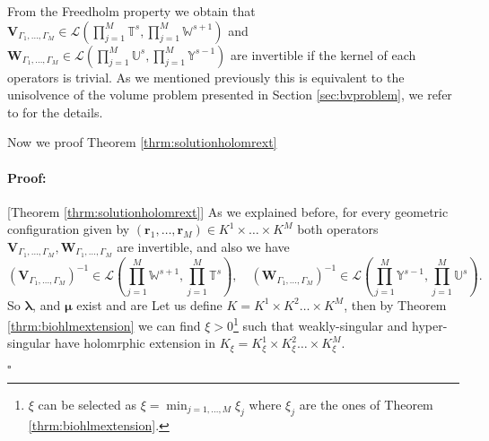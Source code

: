 \documentclass{article}
\newenvironment{proof}{\paragraph{Proof:}}{\hfill$\square$}
\newcommand{\bmu} {\bm{\mu}}
\newcommand{\IU}{{\mathbb U}}
\newcommand{\IT}{{\mathbb T}}
\newcommand{\IW}{{\mathbb W}}
\newcommand{\IY}{{\mathbb Y}}
\newcommand{\bla}{\boldsymbol \lambda}
\newcommand{\br}{\bm{r}}
\begin{document}
From the Freedholm property  we obtain that $\mathbf{V}_{\Gamma_1,\hdots,\Gamma_M} \in \mathcal{L} \left( \prod_{j=1}^M \IT^{s}, \prod_{j=1}^M \IW^{s+1} \right)$ and $\mathbf{W}_{\Gamma_1,\hdots,\Gamma_M} \in \mathcal{L} \left( \prod_{j=1}^M \IU^{s}, \prod_{j=1}^M \IY^{s-1} \right)$ are invertible if the kernel of each operators is trivial. As we mentioned previously this is equivalent to the unisolvence of the volume problem presented in Section \ref{sec:bvproblem}, we refer to \cite{JHP20} for the details.

Now we proof Theorem \ref{thrm:solutionholomrext}

\begin{proof}[Theorem \ref{thrm:solutionholomrext}]
As we explained before, for every geometric configuration given by $(\br_1,\hdots, \br_M) \in K^1 \times \hdots \times K^M$ both operators $\mathbf{V}_{\Gamma_1,\hdots,\Gamma_M},
\mathbf{W}_{\Gamma_1,\hdots,\Gamma_M}$ are invertible, and also we have 
$$
(\mathbf{V}_{\Gamma_1,\hdots,\Gamma_M})^{-1} \in \mathcal{L} \left( \prod_{j=1}^M \IW^{s+1}, \prod_{j=1}^M \IT^s \right), \quad (\mathbf{W}_{\Gamma_1,\hdots,\Gamma_M})^{-1} \in \mathcal{L} \left( \prod_{j=1}^M \IY^{s-1}, \prod_{j=1}^M \IU^s \right).
$$
So $\bla$, and $\bmu$ exist and are 
Let us define $K = K^1\times K^2 \hdots \times K^M$, then by Theorem \ref{thrm:biohlmextension} we can find $\xi>0$\footnote{$\xi$ can be selected as $\xi =\min_{j=1,\hdots,M} \xi_j$ where $\xi_j$ are the ones of Theorem \ref{thrm:biohlmextension}.} such that weakly-singular and hyper-singular have holomrphic extension in $K_\xi = K^1_\xi \times K^2_\xi \hdots \times K^M_\xi$. 


\end{proof}
\end{document}
